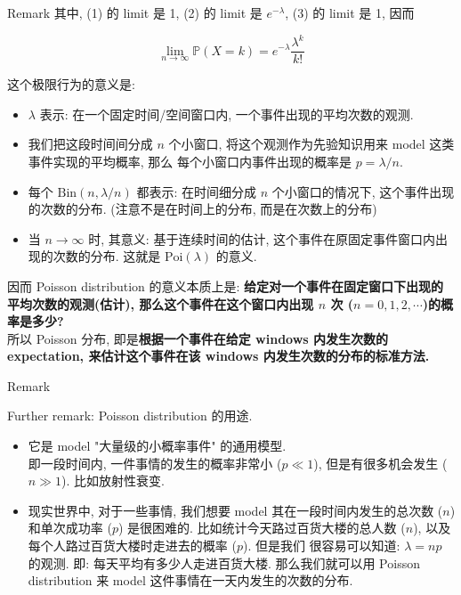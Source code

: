 \begin{example}
\begin{qlremark}{Remark}
其中, (1) 的 limit 是 1, (2) 的 limit 是 \(\mathit{e}^{- \mathit{\lambda}}\), (3) 的 limit 是 1, 因而

\[\lim\limits_{\mathit{n}\rightarrow\infty}\mathbb{P}(\mathit{X} = \mathit{k}) = \mathit{e}^{- \mathit{\lambda}}\frac{\mathit{\lambda}^{\mathit{k}}}{\mathit{k}!}\]

这个极限行为的意义是:

\begin{itemize}
\item
  \(\mathit{\lambda}\) 表示: 在一个固定时间/空间窗口内, 一个事件出现的平均次数的观测.
\item
  我们把这段时间间分成 \(\mathit{n}\) 个小窗口, 将这个观测作为先验知识用来 model 这类事件实现的平均概率, 那么 每个小窗口内事件出现的概率是 \(\mathit{p} = \mathit{\lambda}/\mathit{n}\).
\item
  每个 \(\text{Bin}(\mathit{n},\mathit{\lambda}/\mathit{n})\) 都表示: 在时间细分成 \(\mathit{n}\) 个小窗口的情况下, 这个事件出现的次数的分布. (注意不是在时间上的分布, 而是在次数上的分布)
\item
  当 \(\mathit{n}\rightarrow\infty\) 时, 其意义: 基于连续时间的估计, 这个事件在原固定事件窗口内出现的次数的分布. 这就是 \(\text{Poi}(\mathit{\lambda})\) 的意义.
\end{itemize}

因而 Poisson distribution 的意义本质上是: \textbf{给定对一个事件在固定窗口下出现的平均次数的观测(估计), 那么这个事件在这个窗口内出现 \(\mathit{n}\) 次 (\(\mathit{n} = 0,1,2,\cdots\))的概率是多少?}\\
所以 Poisson 分布, 即是\textbf{根据一个事件在给定 windows 内发生次数的 expectation, 来估计这个事件在该 windows 内发生次数的分布的标准方法.}\\

\end{qlremark}

\begin{qlremark}{Remark}

Further remark: Poisson distribution 的用途.

\begin{itemize}
\item
  它是 model "大量级的小概率事件" 的通用模型.\\
  即一段时间内, 一件事情的发生的概率非常小 (\(\mathit{p} \ll 1\)), 但是有很多机会发生 (\(\mathit{n} \gg 1\)). 比如放射性衰变.
\item
  现实世界中, 对于一些事情, 我们想要 model 其在一段时间内发生的总次数 (\(\mathit{n}\)) 和单次成功率 (\(\mathit{p}\)) 是很困难的. 比如统计今天路过百货大楼的总人数 (\(\mathit{n}\)), 以及每个人路过百货大楼时走进去的概率 (\(\mathit{p}\)). 但是我们 很容易可以知道: \(\mathit{\lambda} = \mathit{n}\mathit{p}\) 的观测. 即: 每天平均有多少人走进百货大楼. 那么我们就可以用 Poisson distribution 来 model 这件事情在一天内发生的次数的分布.\\
\end{itemize}

\end{qlremark}

\end{example}

